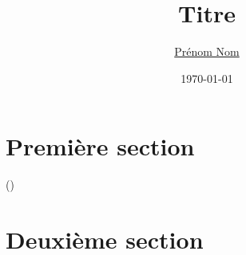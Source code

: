 \documentclass{article}
\date{\today}
\title{Titre}
\author{\href{mailto:prenom.nom@mail.fr}{Prénom Nom}}
\begin{document}
{\huge \noindent \thetitle}

\vspace{3mm}
{\Large \noindent \theauthor}


\vspace{1cm}

\section{Première section}

\lipsum[0-1] (\cite{lafargue_droit_1883})

\section{Deuxième section}

\lipsum[3-4]


\printbibliography{}
\end{document}
